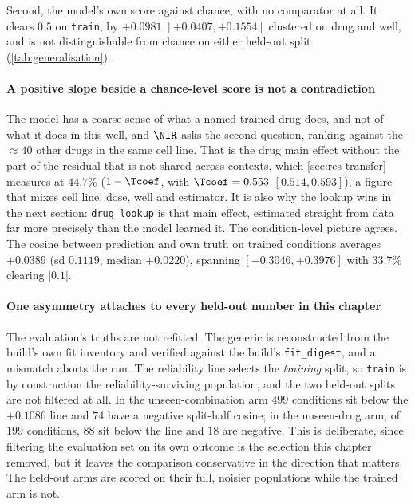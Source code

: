 Second, the model's own score against chance, with no comparator at all. It
clears $0.5$ on \texttt{train}, by $+0.0981$
\nolinebreak[3]$[+0.0407, +0.1554]$ clustered on drug and well, and is not
distinguishable from chance on either held-out split
(\cref{tab:generalisation}).

\paragraph{A positive slope beside a chance-level score is not a contradiction}
The model has a coarse sense of what a named trained drug does, and not of what
it does in this well, and $\NIR$ asks the second question, ranking against the
$\approx 40$ other drugs in the same cell line. That is the drug main effect
without the part of the residual that is not shared across contexts, which
\cref{sec:res-transfer} measures at $44.7\%$ ($1 - \Tcoef$, with
$\Tcoef = 0.553$ \nolinebreak[3]$[0.514, 0.593]$), a figure that mixes cell line,
dose, well and estimator. It is also why the lookup wins in the next section:
\texttt{drug\_lookup} is that main effect, estimated straight from data far more
precisely than the model learned it. The condition-level picture agrees. The
cosine between prediction and own truth on trained conditions averages $+0.0389$
(sd $0.1119$, median $+0.0220$), spanning $[-0.3046, +0.3976]$ with $33.7\%$
clearing $|0.1|$.

\paragraph{One asymmetry attaches to every held-out number in this chapter} The
evaluation's truths are not refitted. The generic is reconstructed from the
build's own fit inventory and verified against the build's \texttt{fit\_digest},
and a mismatch aborts the run. The reliability line selects the \emph{training}
split, so \texttt{train} is by construction the reliability-surviving population,
and the two held-out splits are not filtered at all. In the unseen-combination
arm $\num{499}$ conditions sit below the $+0.1086$ line and $\num{74}$ have a
negative split-half cosine; in the unseen-drug arm, of $\num{199}$ conditions,
$\num{88}$ sit below the line and $\num{18}$ are negative. This is deliberate,
since filtering the evaluation set on its own outcome is the selection this
chapter removed, but it leaves the comparison conservative in the direction that
matters. The held-out arms are scored on their full, noisier populations while
the trained arm is not.

